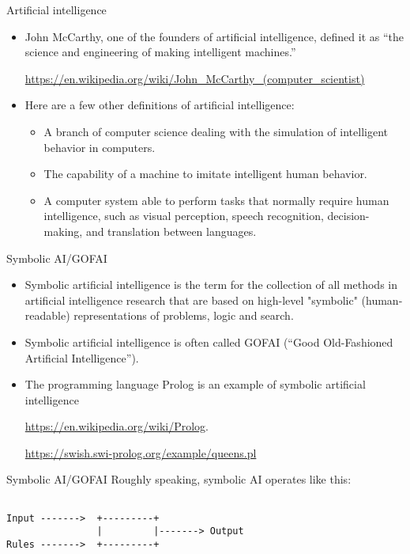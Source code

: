 \documentclass{beamer}
\begin{document}
\begin{frame}{Artificial intelligence}
\begin{itemize}
\item John McCarthy, one of the founders of artificial intelligence, defined it as ``the science and engineering of making intelligent machines.''

\url{https://en.wikipedia.org/wiki/John_McCarthy_(computer_scientist)}

\item Here are a few other definitions of artificial intelligence:

\begin{itemize}
\item A branch of computer science dealing with the simulation of intelligent behavior in computers.

\item The capability of a machine to imitate intelligent human behavior.

\item A computer system able to perform tasks that normally require human intelligence, such as visual perception, speech recognition, decision-making, and translation between languages.
\end{itemize}
\end{itemize}
\end{frame}

\begin{frame}{Symbolic AI/GOFAI}
\begin{itemize}
\item Symbolic artificial intelligence is the term for the collection of all methods in artificial intelligence research that are based on high-level "symbolic" (human-readable) representations of problems, logic and search.

\item Symbolic artificial intelligence is often called GOFAI (``Good Old-Fashioned Artificial Intelligence'').

\item The programming language Prolog is an example of symbolic artificial intelligence 

\url{https://en.wikipedia.org/wiki/Prolog}.

\url{https://swish.swi-prolog.org/example/queens.pl}
\end{itemize}
\end{frame}

\begin{frame}[fragile]{Symbolic AI/GOFAI}
Roughly speaking, symbolic AI operates like this:
\begin{verbatim}
                    
Input ------->  +---------+
                |         |-------> Output
Rules ------->  +---------+

\end{verbatim}
\end{frame}
\end{document}

